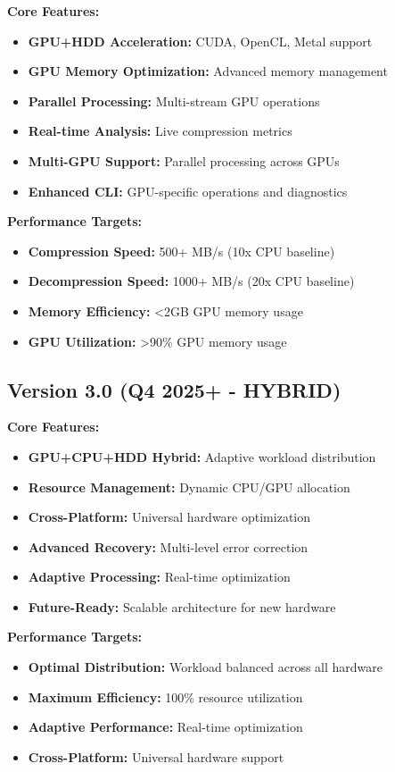 \documentclass[12pt,a4paper]{article}
\begin{document}
\textbf{Core Features:}
\begin{itemize}
    \item \textbf{GPU+HDD Acceleration:} CUDA, OpenCL, Metal support
    \item \textbf{GPU Memory Optimization:} Advanced memory management
    \item \textbf{Parallel Processing:} Multi-stream GPU operations
    \item \textbf{Real-time Analysis:} Live compression metrics
    \item \textbf{Multi-GPU Support:} Parallel processing across GPUs
    \item \textbf{Enhanced CLI:} GPU-specific operations and diagnostics
\end{itemize}

\textbf{Performance Targets:}
\begin{itemize}
    \item \textbf{Compression Speed:} 500+ MB/s (10x CPU baseline)
    \item \textbf{Decompression Speed:} 1000+ MB/s (20x CPU baseline)
    \item \textbf{Memory Efficiency:} <2GB GPU memory usage
    \item \textbf{GPU Utilization:} >90\% GPU memory usage
\end{itemize}

\subsection{Version 3.0 (Q4 2025+ - HYBRID)}

\textbf{Core Features:}
\begin{itemize}
    \item \textbf{GPU+CPU+HDD Hybrid:} Adaptive workload distribution
    \item \textbf{Resource Management:} Dynamic CPU/GPU allocation
    \item \textbf{Cross-Platform:} Universal hardware optimization
    \item \textbf{Advanced Recovery:} Multi-level error correction
    \item \textbf{Adaptive Processing:} Real-time optimization
    \item \textbf{Future-Ready:} Scalable architecture for new hardware
\end{itemize}

\textbf{Performance Targets:}
\begin{itemize}
    \item \textbf{Optimal Distribution:} Workload balanced across all hardware
    \item \textbf{Maximum Efficiency:} 100\% resource utilization
    \item \textbf{Adaptive Performance:} Real-time optimization
    \item \textbf{Cross-Platform:} Universal hardware support
\end{itemize}
\end{document}
